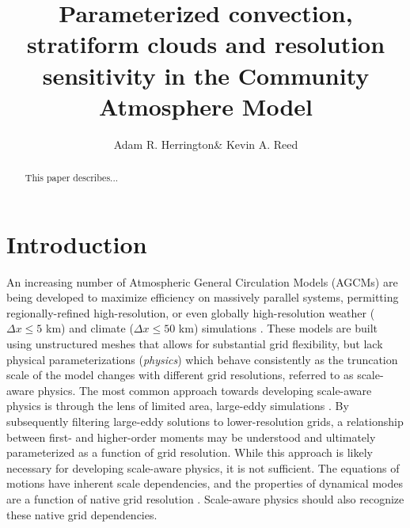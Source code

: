 \documentclass[times]{qjrms4}
\begin{document}

\title{Parameterized convection, stratiform clouds and resolution sensitivity in the Community Atmosphere Model}

\author{Adam R. Herrington\corrauth \& Kevin A. Reed}
\address{School of Marine and Atmospheric Sciences, Stony Brook University, Stony Brook, NY 11794}


\begin{abstract}
This paper describes...
\end{abstract}


\maketitle

\section{Introduction}

An increasing number of Atmospheric General Circulation Models (AGCMs) are being developed to maximize efficiency on massively parallel systems, permitting regionally-refined high-resolution, or even globally high-resolution weather ($\Delta x \leq 5$ km) and climate ($\Delta x \leq 50$ km) simulations \citep{SMTMN2008JCP,MPASatm,Z2014QJRMS,HETAL2016JCLIM,DCMIP16,LetAl2018JAMES}. These models are built using unstructured meshes that allows for substantial grid flexibility, but lack physical parameterizations ({\em{physics}}) which behave consistently as the truncation scale of the model changes with different grid resolutions, referred to as scale-aware physics. The most common approach towards developing scale-aware physics is through the lens of limited area, large-eddy simulations \citep[e.g.,][]{PC2008JAS,AW2013JAS,SZ2018JCLIM}. By subsequently filtering large-eddy solutions to lower-resolution grids, a relationship between first- and higher-order moments may be understood and ultimately parameterized as a function of grid resolution. While this approach is likely necessary for developing scale-aware physics, it is not sufficient. The equations of motions have inherent scale dependencies, and the properties of dynamical modes are a function of native grid resolution \citep{O1981JAS,WETAL1997MWR,PG2006JAS,JR2016QJRMS}. Scale-aware physics should also recognize these native grid dependencies.
\end{document}
